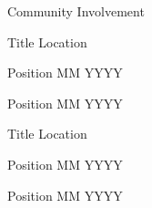\documentclass{resume}
\begin{document}
\newpage
\begin{headersection}
    {Community Involvement}

    \begin{subprojectitemsection}
        {Title}
        {Location}

        \begin{subprojectitem}
        {Position}
        {MM YYYY}
        
            \item \lipsum[9][3-4]
            \item \lipsum[6][1-6]
            \item \lipsum[1][7-9]
            \item \lipsum[3][10-12]
        \end{subprojectitem}
        \begin{subprojectitem}
        {Position}
        {MM YYYY}
        
            \item \lipsum[9][3-4]
            \item \lipsum[8][7-9]
        \end{subprojectitem}
    \end{subprojectitemsection}
    \subprojectitemsectionskip
    \begin{subprojectitemsection}
        {Title}
        {Location}

        \begin{subprojectitem}
        {Position}
        {MM YYYY}
        
            \item \lipsum[1][3-4]
            \item \lipsum[5][1-6]
        \end{subprojectitem}
        \begin{subprojectitem}
        {Position}
        {MM YYYY}
        
            \item \lipsum[6][3-4]
            \item \lipsum[3][7-9]
            \item \lipsum[1][1-6]
        \end{subprojectitem}
    \end{subprojectitemsection}
\end{headersection}
\end{document}

